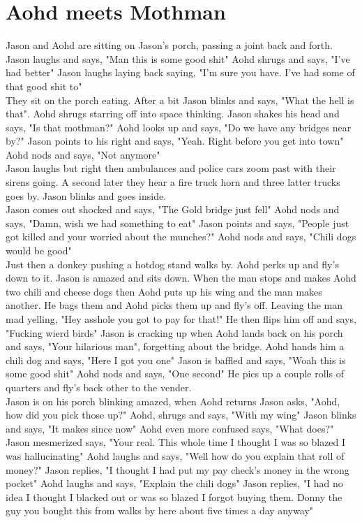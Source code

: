 \documentclass{memoir}[12px]
\begin{document}
\chapter* {Aohd meets Mothman}
Jason and Aohd are sitting on Jason's porch, passing a joint back and forth. Jason laughs and says, "Man this is some good shit" Aohd shrugs and says, "I've had better" Jason laughs laying back saying, "I'm sure you have. I've had some of that good shit to" \\

They sit on the porch eating. After a bit Jason blinks and says, "What the hell is that". Aohd shrugs starring off into space thinking. Jason shakes his head and says, "Is that mothman?" Aohd looks up and says, "Do we have any bridges near by?" Jason points to his right and says, "Yeah. Right before you get into town" Aohd nods and says, "Not anymore"\\

Jason laughs but right then ambulances and police cars zoom past with their sirens going. A second later they hear a fire truck horn and three latter trucks goes by. Jason blinks and goes inside.\\

Jason comes out shocked and says, "The Gold bridge just fell" Aohd nods and says, "Damn, wish we had something to eat" Jason points and says, "People just got killed and your worried about the munches?" Aohd nods and says, "Chili dogs would be good" \\

Just then a donkey pushing a hotdog stand walks by. Aohd perks up and fly's down to it. Jason is amazed and sits down. When the man stops and makes Aohd two chili and cheese dogs then Aohd puts up his wing and the man makes another. He bags them and Aohd picks them up and fly's off. Leaving the man mad yelling, "Hey asshole you got to pay for that!" He then flips him off and says, "Fucking wierd birds" Jason is cracking up when Aohd lands back on his porch and says, "Your hilarious man", forgetting about the bridge. Aohd hands him a chili dog and says, "Here I got you one" Jason is baffled and says, "Woah this is some good shit" Aohd nods and says, "One second" He pics up a couple rolls of quarters and fly's back other to the vender.\\

Jason is on his porch blinking amazed, when Aohd returns Jason asks, "Aohd, how did you pick those up?" Aohd, shrugs and says, "With my wing" Jason blinks and says, "It makes since now" Aohd even more confused says, "What does?" Jason mesmerized says, "Your real. This whole time I thought I was so blazed I was hallucinating" Aohd laughs and says, "Well how do you explain that roll of money?" Jason replies, "I thought I had put my pay check's money in the wrong pocket" Aohd laughs and says, "Explain the chili dogs" Jason replies, "I had no idea I thought I blacked out or was so blazed I forgot buying them. Donny the guy you bought this from walks by here about five times a day anyway" 
\end{document}
